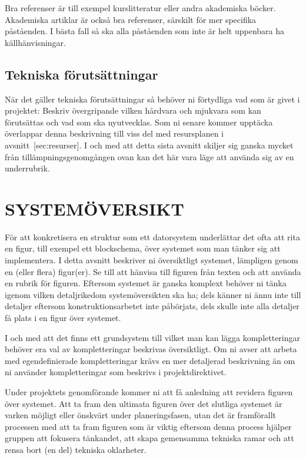 \documentclass[a4paper]{article}
\begin{document}
Bra referenser är till exempel kurslitteratur eller andra akademiska
böcker. Akademiska artiklar är också bra referenser, särskilt för mer
specifika påståenden. I bästa fall så ska alla påståenden som inte är
helt uppenbara ha källhänvisningar.


\subsection{Tekniska förutsättningar}

När det gäller tekniska förutsättningar så behöver ni förtydliga vad som
är givet i projektet: Beskriv övergripande vilken hårdvara och mjukvara
som kan förutsättas och vad som ska nyutvecklas. Som ni senare kommer
upptäcka överlappar denna beskrivning till viss del med resursplanen i
avsnitt [sec:resurser]. I och med att detta sista avsnitt skiljer sig
ganska mycket från tillämpningsgenomgången ovan kan det här vara läge
att använda sig av en underrubrik.



\section{SYSTEMÖVERSIKT}


För att konkretisera en struktur som ett datorsystem underlättar det
ofta att rita en figur, till exempel ett blockschema, över systemet som
man tänker sig att implementera. I detta avsnitt beskriver ni
översiktligt systemet, lämpligen genom en (eller flera) figur(er). Se
till att hänvisa till figuren från texten och att använda en rubrik för
figuren. Eftersom systemet är ganska komplext behöver ni tänka igenom
vilken detaljrikedom systemöversikten ska ha; dels känner ni ännu inte
till detaljer eftersom konstruktionsarbetet inte påbörjats, dels skulle
inte alla detaljer få plats i en figur över systemet.

I och med att det finns ett grundsystem till vilket man kan lägga
kompletteringar behöver era val av kompletteringar beskrivas
översiktligt. Om ni avser att arbeta med egendefinierade kompletteringar
krävs en mer detaljerad beskrivning än om ni använder kompletteringar
som beskrivs i projektdirektivet.

Under projektets genomförande kommer ni att få anledning att revidera
figuren över systemet. Att ta fram den ultimata figuren över det
slutliga systemet är varken möjligt eller önskvärt under
planeringsfasen, utan det är framförallt processen med att ta fram
figuren som är viktig eftersom denna process hjälper gruppen att
fokusera tänkandet, att skapa gemensamma tekniska ramar och att rensa
bort (en del) tekniska oklarheter.
\end{document}
